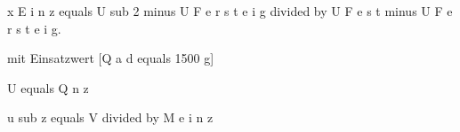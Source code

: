 x E i n z equals U sub 2 minus U F e r s t e i g divided by U F e s t minus U F e r s t e i g.

mit Einsatzwert [Q a d equals 1500 g]

U equals Q n z

u sub z equals V divided by M e i n z